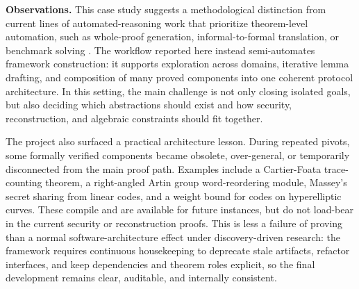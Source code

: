 \documentclass[11pt,a4paper]{article}
\begin{document}

\noindent\textbf{Observations.}
This case study suggests a methodological distinction from current lines of
automated-reasoning work that prioritize theorem-level automation, such as
whole-proof generation, informal-to-formal translation, or benchmark solving
\cite{first2023baldur,jiang2023dsp,alphaproof2024}. The workflow reported here
instead semi-automates framework construction: it supports exploration across
domains, iterative lemma drafting, and composition of many proved components
into one coherent protocol architecture. In this setting, the main challenge is
not only closing isolated goals, but also deciding which abstractions should
exist and how security, reconstruction, and algebraic constraints should fit
together.

The project also surfaced a practical architecture lesson. During repeated
pivots, some formally verified components became obsolete, over-general, or
temporarily disconnected from the main proof path. Examples include a
Cartier-Foata trace-counting theorem, a right-angled Artin group word-reordering
module, Massey's secret sharing from linear codes, and a weight bound for codes
on hyperelliptic curves. These compile and are available for future instances,
but do not load-bear in the current security or reconstruction proofs. This is
less a failure of proving than a normal software-architecture effect under
discovery-driven research: the framework requires continuous housekeeping to
deprecate stale artifacts, refactor interfaces, and keep dependencies and
theorem roles explicit, so the final development remains clear, auditable, and
internally consistent. 

\end{document}
